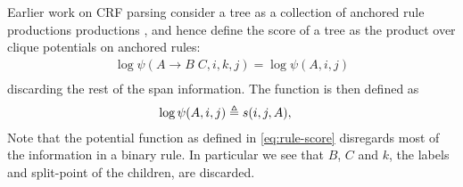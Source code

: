 Earlier work on CRF parsing consider a tree as a collection of anchored rule productions productions \cite{finkel2008crf,klein2015crf}, and hence define the score of a tree as the product over clique potentials on anchored rules:
\begin{align}
  \log\psi(A \to B \;C, i, k, j) = \log\psi(A, i, j)\\
\end{align}
discarding the rest of the span information. The function is then defined as
\begin{align}
  \label{eq:span-score}
  \log\psi(A, i, j) &\triangleq s(i, j, A),
\end{align}
Note that the potential function as defined in \ref{eq:rule-score} disregards most of the information in a binary rule. In particular we see that $B$, $C$ and $k$, the labels and split-point of the children, are discarded.


